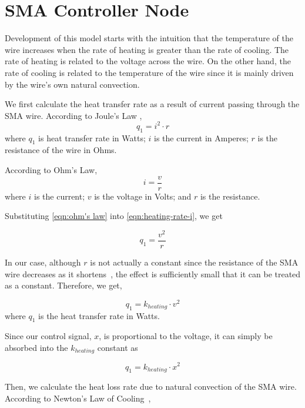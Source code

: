 
\section{SMA Controller Node}\label{Append:SMA Controller}
Development of this model starts with the intuition that the temperature of the wire increases when the rate of heating is greater than the rate of cooling. The rate of heating is related to the voltage across the wire. On the other hand, the rate of cooling is related to the temperature of the wire since it is mainly driven by the wire's own natural convection. 

We first calculate the heat transfer rate as a result of current passing through the SMA wire. According to Joule's Law \cite{JoulesLaw},
\begin{equation}
q_1 = i^2 \cdot r
\end{equation}
where $q_1$ is heat transfer rate in Watts; $i$ is the current in Amperes; $r$ is the resistance of the wire in Ohms.

According to Ohm's Law, 
\begin{equation}\label{eqn:ohm's law}
i = \frac{v}{r}
\end{equation}
where $i$ is the current; $v$ is the voltage in Volts; and $r$ is the resistance.

Substituting \eqref{eqn:ohm's law} into \eqref{eqn:heating-rate-i}, we get

\begin{equation}\label{eqn:heating-rate-v}
q_1 = \frac{v^2}{r}
\end{equation}

In our case, although $r$ is not actually a constant since the resistance of the SMA wire decreases as it shortens~\cite{FlexinolTechSpecs}, the effect is sufficiently small that it can be treated as a constant. Therefore, we get,

\begin{equation}\label{eqn:heating-rate-i}
q_1 = k_{heating} \cdot v^2
\end{equation}
where $q_1$ is the heat transfer rate in Watts.

Since our control signal, $x$, is proportional to the voltage, it can simply be absorbed into the $k_{heating}$ constant as 

\begin{equation}\label{eqn:heating-rate-x}
q_1 = k_{heating} \cdot x^2
\end{equation}

Then, we calculate the heat loss rate due to natural convection of the SMA wire. According to Newton's Law of Cooling~\cite{Burmeister1993}, 

